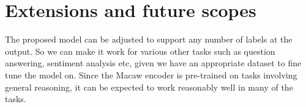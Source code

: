 
\chapter{Extensions and future scopes} %

\label{Chapter5} %



The proposed model can be adjusted to support any number of labels at the output. So we can make it work for various other tasks such as question answering, sentiment analysis etc, given we have an appropriate dataset to fine tune the model on. Since the Macaw encoder is pre-trained on tasks involving general reasoning, it can be expected to work reasonably well in many of the tasks.

